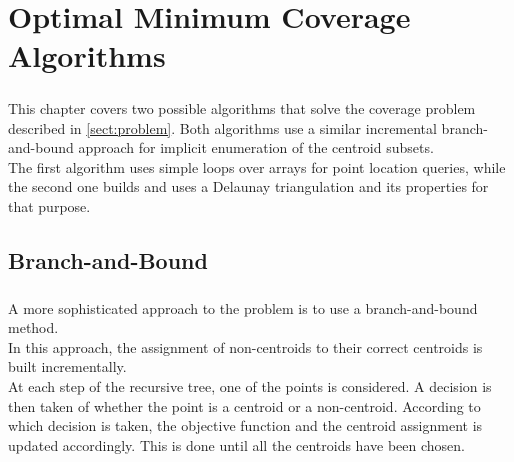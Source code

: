 \chapter{Optimal Minimum Coverage Algorithms}
\label{chap:algos}
\paragraph{}
This chapter covers two possible algorithms that solve the coverage problem described in \ref{sect:problem}. Both algorithms use a similar incremental branch-and-bound approach for implicit enumeration of the centroid subsets.\\
The first algorithm uses simple loops over arrays for point location queries, while the second one builds and uses a Delaunay triangulation and its properties for that purpose.

\section{Branch-and-Bound}
\label{alg:bb}
\paragraph{}
A more sophisticated approach to the problem is to use a branch-and-bound method.\\
In this approach, the assignment of non-centroids to their correct centroids is built incrementally.\\
At each step of the recursive tree, one of the points is considered. A decision is then taken of whether the point is a centroid or a non-centroid. According to which decision is taken, the objective function and the centroid assignment is updated accordingly. This is done until all the centroids have been chosen.
